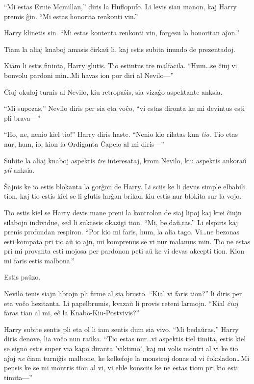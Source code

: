 ``Mi estas Ernie Mcmillan,'' diris la Huflopufo. Li levis sian manon,
kaj Harry premis ĝin. ``Mi estas honorita renkonti vin.''

Harry klinetis sin. ``Mi estas kontenta renkonti vin, forgesu la
honoritan aĵon.''

Tiam la aliaj knaboj amasis ĉirkaŭ li, kaj estis subita inundo de
prezentadoj.

Kiam li estis fininta, Harry glutis. Tio estintus tre
malfacila. ``Hum\ldots se ĉiuj vi bonvolu pardoni min\ldots Mi havas
ion por diri al Nevilo—''

Ĉiuj okuloj turnis al Nevilo, kiu retropaŝis, sia vizaĝo aspektante
anksia.

``Mi supozas,'' Nevilo diris per sia eta voĉo, ``vi estas dironta ke
mi devintus esti pli brava—''

``Ho, ne, nenio kiel tio!'' Harry diris haste. ``Nenio kio rilatas kun
\emph{tio}. Tio etas nur, hum, io, kion la Ordiganta Ĉapelo al mi
diris—''

Subite la aliaj knaboj aspektis \emph{tre} interesataj, krom Nevilo,
kiu aspektis ankoraŭ \emph{pli} anksia.

Ŝajnis ke io estis blokanta la gorĝon de Harry. Li sciis ke li devus
simple elbabili tion, kaj tio estis kiel se li glutis larĝan brikon
kiu estis nur blokita sur la vojo.

Tio estis kiel se Harry devis mane preni la kontrolon de siaj lipoj
kaj krei ĉiujn silabojn individue, sed li sukcesis okazigi tion. ``Mi,
be,daŭ,ras.'' Li elspiris kaj prenis profundan respiron. ``Por kio mi
faris, hum, la alia tago. Vi\ldots ne bezonas esti kompata pri tio aŭ
io ajn, mi komprenus se vi nur malamus min. Tio ne estas pri mi
provanta esti mojosa per pardonon peti aŭ ke vi devas akcepti
tion. Kion mi faris estis malbona.''

Estis paŭzo.

Nevilo tenis siajn librojn pli firme al sia brusto. ``Kial vi faris
tion?'' li diris per eta voĉo hezitanta. Li papelbrumis, kvazaŭ li
provis reteni larmojn.  ``Kial \emph{ĉiuj} faras tian al mi, eĉ la
Knabo-Kiu-Postvivis?''

Harry subite sentis pli eta ol li iam sentis dum sia vivo. ``Mi
bedaŭras,'' Harry diris denove, lia voĉo nun raŭka. ``Tio estas
nur\ldots vi aspektis tiel timita, estis kiel se signo estis super via
kapo diranta 'viktimo', kaj mi volis montri al vi ke tio aĵoj
\emph{ne} ĉiam turniĝis malbone, ke kelkefoje la monstroj donas al vi
ĉokoladon\ldots Mi pensis ke se mi montris tion al vi, vi eble
konsciis ke ne estas tiom pri kio esti timita—''

